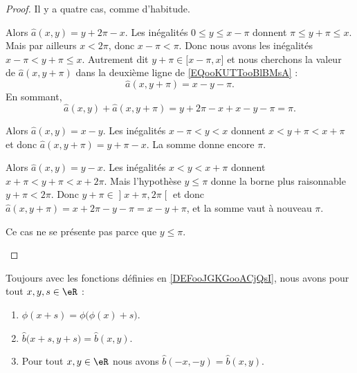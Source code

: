 \begin{proof}
	Il y a quatre cas, comme d'habitude.
	\begin{subproof}
		Alors \( \hat a(x,y)=y+2\pi-x\). Les inégalités \( 0\leq y\leq x-\pi\) donnent \( \pi\leq y+\pi\leq x\). Mais par ailleurs \( x<2\pi\), donc \( x-\pi<\pi\). Donc nous avons les inégalités \( x-\pi<y+\pi\leq x\). Autrement dit \( y+\pi\in\mathopen[ x-\pi,x\mathclose]\) et nous cherchons la valeur de \( \hat a(x,y+\pi)\) dans la deuxième ligne de \eqref{EQooKUTTooBlBMsA} :
		\begin{equation}
			\hat a(x,y+\pi)=x-y-\pi.
		\end{equation}
		En sommant,
		\begin{equation}
			\hat a(x,y)+\hat a(x,y+\pi)=y+2\pi-x+x-y-\pi=\pi.
		\end{equation}

		Alors \( \hat a(x,y)=x-y\). Les inégalités \( x-\pi<y<x\) donnent \( x<y+\pi<x+\pi\) et donc \( \hat a(x,y+\pi)=y+\pi-x\). La somme donne encore \( \pi\).

		Alors \( \hat a(x,y)=y-x\). Les inégalités \( x<y<x+\pi\) donnent \( x+\pi<y+\pi<x+2\pi\). Mais l'hypothèse \( y\leq \pi\) donne la borne plus raisonnable \( y+\pi<2\pi\). Donc \( y+\pi\in\mathopen] x+\pi,2\pi\mathclose[\) et donc \( \hat a(x,y+\pi)=x+2\pi-y-\pi=x-y+\pi\), et la somme vaut à nouveau \( \pi\).

		Ce cas ne se présente pas parce que \( y\leq\pi\).
	\end{subproof}
\end{proof}

\begin{proposition}	\label{PROPooUPDRooWVowjv}
	Toujours avec les fonctions définies en \ref{DEFooJGKGooACjQsI}, nous avons pour tout \( x,y,s\in \eR\) :
	\begin{enumerate}
		\item		\label{ITEMooOPVBooRdckBk}
		      \( \phi(x+s)=\phi\big( \phi(x)+s \big)\).
		\item		\label{ITEMooVVEAooBojOhe}
		      \( \hat b\big( x+s,y+s \big)=\hat b(x,y) \).
		\item	\label{ITEMooYNBYooEhFtGi}
		      Pour tout \( x,y\in \eR\) nous avons \( \hat b(-x,-y)=\hat b(x,y)\).
	\end{enumerate}
\end{proposition}

